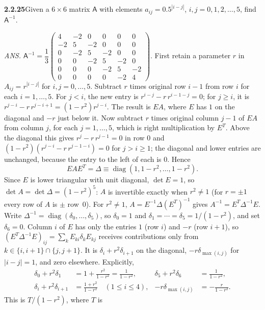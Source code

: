 \par\bigskip
\noindent\textbf{2.2.25}\quad Given a $6\times6$ matrix $\mathsf{A}$ with
elements $a_{ij}=0.5^{|i-j|}$, $i,j=0,1,2,\ldots,5$, find $\mathsf{A}^{-1}$.
\par\nobreak\hfill\emph{ANS.}\enspace
$\mathsf{A}^{-1}=\dfrac{1}{3}\begin{pmatrix}
4&-2&0&0&0&0\\-2&5&-2&0&0&0\\0&-2&5&-2&0&0\\
0&0&-2&5&-2&0\\0&0&0&-2&5&-2\\0&0&0&0&-2&4
\end{pmatrix}$.
\solution
First retain a parameter $r$ in $A_{ij}=r^{|i-j|}$ for
$i,j=0,\ldots,5$. Subtract $r$ times original row $i-1$ from
row $i$ for each $i=1,\ldots,5$. For $j<i$, the new entry is
$r^{i-j}-r\,r^{i-1-j}=0$; for $j\ge i$, it is
$r^{j-i}-r\,r^{j-i+1}=(1-r^2)r^{j-i}$.
The result is $EA$, where $E$ has $1$ on the diagonal and $-r$ just
below it. Now subtract $r$ times original column $j-1$ of $EA$ from
column $j$, for each $j=1,\ldots,5$, which is right multiplication by
$E^T$. Above the
diagonal this gives $r^j-r\,r^{j-1}=0$ in row $0$ and
$(1-r^2)(r^{j-i}-r\,r^{j-1-i})=0$ for $j>i\ge1$; the diagonal and
lower entries are unchanged, because the entry to the left of each is
$0$. Hence
\[
EAE^T=\Delta\equiv\operatorname{diag}(1,1-r^2,\ldots,1-r^2).
\]
Since $E$ is lower triangular with unit diagonal, $\det E=1$, so
$\det A=\det\Delta=(1-r^2)^5$: $A$ is invertible exactly when
$r^2\ne1$ (for $r=\pm1$ every row of $A$ is $\pm$ row~$0$).
For $r^2\ne1$, $A=E^{-1}\Delta(E^T)^{-1}$ gives
$A^{-1}=E^T\Delta^{-1}E$.
Write $\Delta^{-1}=\operatorname{diag}(\delta_0,\ldots,\delta_5)$, so
$\delta_0=1$ and $\delta_1=\cdots=\delta_5=1/(1-r^2)$, and set
$\delta_6=0$. Column $i$ of $E$ has only the entries $1$ (row $i$) and
$-r$ (row $i+1$), so $(E^T\Delta^{-1}E)_{ij}=\sum_kE_{ki}\delta_kE_{kj}$
receives contributions only from $k\in\{i,i+1\}\cap\{j,j+1\}$. It is
$\delta_i+r^2\delta_{i+1}$ on the diagonal, $-r\delta_{\max(i,j)}$ for
$|i-j|=1$, and zero elsewhere. Explicitly,
\[
\begin{aligned}
\delta_0+r^2\delta_1&=1+\frac{r^2}{1-r^2}=\frac1{1-r^2},&
\delta_5+r^2\delta_6&=\frac1{1-r^2},\\
\delta_i+r^2\delta_{i+1}&=\frac{1+r^2}{1-r^2}\quad(1\le i\le4),&
-r\delta_{\max(i,j)}&=-\frac{r}{1-r^2}.
\end{aligned}
\]
This is $T/(1-r^2)$, where $T$ is
